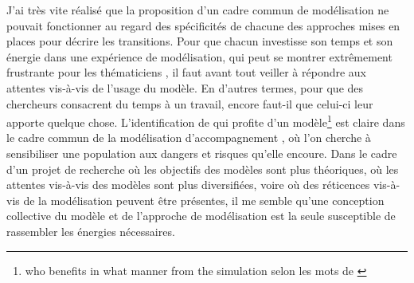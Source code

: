 J'ai très vite réalisé que la proposition d'un cadre commun de modélisation ne pouvait fonctionner au regard des spécificités de chacune des approches mises en places pour décrire les transitions.
Pour que chacun investisse son temps et son énergie dans une expérience de modélisation, qui peut se montrer extrêmement frustrante pour les thématiciens \autocite[470]{ouriachi_lelaboration_2017}, il faut avant tout veiller à répondre aux attentes vis-à-vis de l'usage du modèle.
En d'autres termes, pour que des chercheurs consacrent du temps à un travail, encore faut-il que celui-ci leur apporte quelque chose.
L'identification de qui \og profite\fg{} d'un modèle\footnote{
\og who benefits in what manner from the simulation\fg{} selon les mots de \textcite[260]{lake_trends_2014}
} est claire dans le cadre commun de la modélisation d'accompagnement \autocite[voir][par exemple]{etienne_modelisation_2015}, où l'on cherche à sensibiliser une population aux dangers et risques qu'elle encoure.
Dans le cadre d'un projet de recherche où les objectifs des modèles sont plus théoriques, où les attentes vis-à-vis des modèles sont plus diversifiées, voire où des réticences vis-à-vis de la modélisation peuvent être présentes, il me semble qu'une conception collective du modèle et de l'approche de modélisation est la seule susceptible de rassembler les énergies nécessaires.

